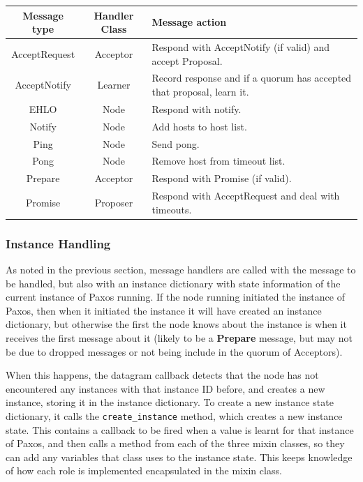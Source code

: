 \documentclass[12pt,twoside,notitlepage]{report}
\newcommand{\msg}[1] {{\bf #1}}         %
\begin{document}
\begin{tabular}{ | c | c | p{7cm} | }
  \hline
  {\bf Message type} & {\bf Handler Class} & {\bf Message action} \\ \hline
  AcceptRequest & Acceptor & Respond with AcceptNotify (if valid) and accept Proposal. \\ \hline
  AcceptNotify & Learner & Record response and if a quorum has accepted that proposal, learn it. \\ \hline
  EHLO & Node & Respond with notify. \\ \hline
  Notify & Node & Add hosts to host list. \\ \hline
  Ping & Node & Send pong.  \\ \hline
  Pong & Node & Remove host from timeout list. \\ \hline
  Prepare & Acceptor & Respond with Promise (if valid). \\ \hline
  Promise & Proposer & Respond with AcceptRequest and deal with timeouts. \\ \hline
\end{tabular}

\subsubsection{Instance Handling}

\label{sec:paxos-instance}

As noted in the previous section, message handlers are called with the message to be handled, but
also with an instance dictionary with state information of the current instance of Paxos running.
If the node running initiated the instance of Paxos, then when it initiated the instance it will
have created an instance dictionary, but otherwise the first the node knows about the instance is
when it receives the first message about it (likely to be a \msg{Prepare} message, but may not be
due to dropped messages or not being include in the quorum of Acceptors).

When this happens, the datagram callback detects that the node has not encountered any instances
with that instance ID before, and creates a new instance, storing it in the instance dictionary.
To create a new instance state dictionary, it calls the \verb+create_instance+ method, which
creates a new instance state. This contains a callback to be fired when a value is learnt for that
instance of Paxos, and then calls a method from each of the three mixin classes, so they can add
any variables that class uses to the instance state. This keeps knowledge of how each role is
implemented encapsulated in the mixin class.
\end{document}
